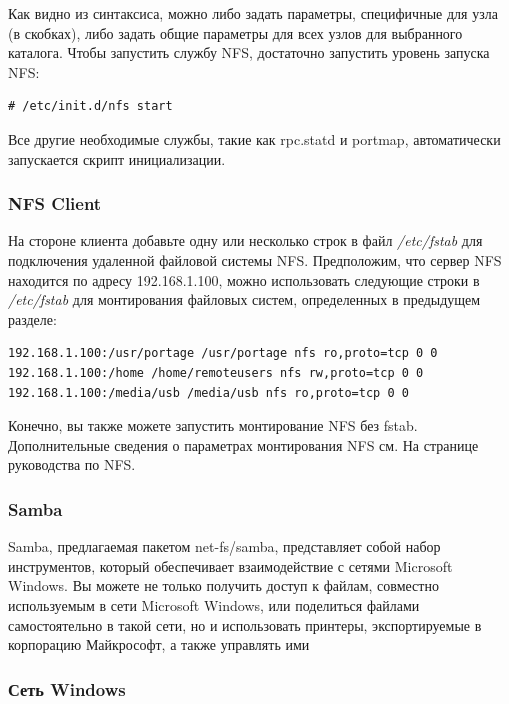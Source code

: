 \documentclass[10pt]{book}
\begin{document}
Как видно из синтаксиса, можно либо задать параметры, специфичные для узла (в скобках), либо задать общие параметры для всех узлов для выбранного каталога.
Чтобы запустить службу NFS, достаточно запустить уровень запуска NFS:

\begin{tcolorbox} 
\begin{lstlisting}
# /etc/init.d/nfs start
\end{lstlisting}
\end{tcolorbox}

Все другие необходимые службы, такие как rpc.statd и portmap, автоматически запускается скрипт инициализации.

\subsubsection{NFS Client}

На стороне клиента добавьте одну или несколько строк в файл \textit{/etc/fstab} для подключения удаленной файловой системы NFS. Предположим, что сервер NFS находится по адресу 192.168.1.100, можно использовать следующие строки в \textit{/etc/fstab} для монтирования файловых систем, определенных в предыдущем разделе:
\begin{tcolorbox} 
\begin{lstlisting}
192.168.1.100:/usr/portage /usr/portage nfs ro,proto=tcp 0 0
192.168.1.100:/home /home/remoteusers nfs rw,proto=tcp 0 0
192.168.1.100:/media/usb /media/usb nfs ro,proto=tcp 0 0
\end{lstlisting}
\end{tcolorbox}

Конечно, вы также можете запустить монтирование NFS без fstab. Дополнительные сведения о параметрах монтирования NFS см. На странице руководства по NFS.

\subsubsection{Samba}

Samba, предлагаемая пакетом net-fs/samba, представляет собой набор инструментов, который обеспечивает взаимодействие с сетями Microsoft Windows. Вы можете не только получить доступ к файлам, совместно используемым в сети Microsoft Windows, или поделиться файлами самостоятельно в такой сети, но и использовать принтеры, экспортируемые в корпорацию Майкрософт, а также управлять ими

\subsubsection{Сеть Windows}
\end{document}
